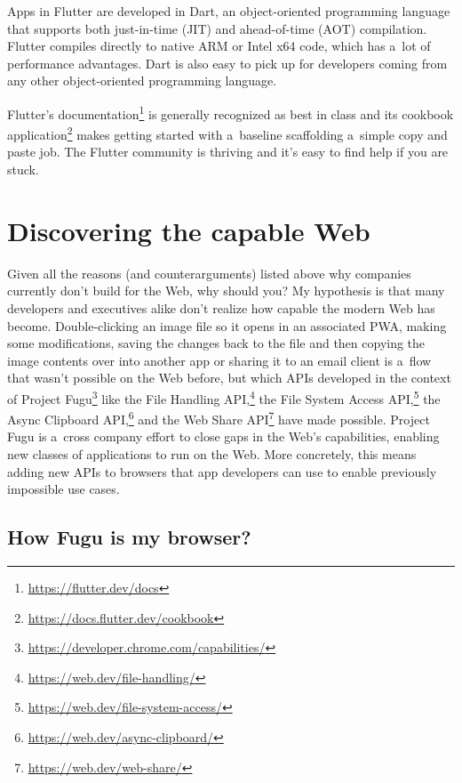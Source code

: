 \documentclass[sigconf]{acmart}
\begin{document}
Apps in Flutter are developed in Dart, an object-oriented programming language that supports both just-in-time (JIT) and ahead-of-time (AOT) compilation. Flutter compiles directly to native ARM or Intel x64 code, which has a~lot of performance advantages. Dart is also easy to pick up for developers coming from any other object-oriented programming language.

Flutter’s documentation\footnote{\url{https://flutter.dev/docs}} is generally recognized as best in class and its cookbook application\footnote{\url{https://docs.flutter.dev/cookbook}} makes getting started with a~baseline scaffolding a~simple copy and paste job. The Flutter community is thriving and it's easy to find help if you are stuck.

\section{Discovering the capable Web}

Given all the reasons (and counterarguments) listed above why companies currently don't build for the Web, why should you? My hypothesis is that many developers and executives alike don't realize how capable the modern Web has become. Double-clicking an image file so it opens in an associated PWA, making some modifications, saving the changes back to the file and then copying the image contents over into another app or sharing it to an email client is a~flow that wasn't possible on the Web before, but which APIs developed in the context of Project Fugu\footnote{\url{https://developer.chrome.com/capabilities/}} like the File Handling API,\footnote{\url{https://web.dev/file-handling/}} the File System Access API,\footnote{\url{https://web.dev/file-system-access/}} the Async Clipboard API,\footnote{\url{https://web.dev/async-clipboard/}} and the Web Share API\footnote{\url{https://web.dev/web-share/}} have made possible. Project Fugu is a~cross company effort to close gaps in the Web's capabilities, enabling new classes of applications to run on the Web. More concretely, this means adding new APIs to browsers that app developers can use to enable previously impossible use cases.

\subsection{How Fugu is my browser?}
\end{document}
